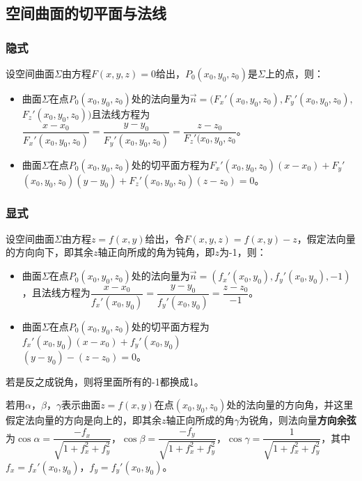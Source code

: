 \documentclass[UTF8, 12pt]{ctexart}
\begin{document}
\subsection{空间曲面的切平面与法线}

\subsubsection{隐式}

设空间曲面$\varSigma$由方程$F(x,y,z)=0$给出，$P_0(x_0,y_0,z_0)$是$\varSigma$上的点，则：

\begin{itemize}
    \item 曲面$\varSigma$在点$P_0(x_0,y_0,z_0)$处的法向量为$\vec{n}=(F_x'(x_0,y_0,z_0),F_y'(x_0,y_0,z_0),$\\$F_z'(x_0,y_0,z_0))$且法线方程为$\dfrac{x-x_0}{F_x'(x_0,y_0,z_0)}=\dfrac{y-y_0}{F_y'(x_0,y_0,z_0)}=\dfrac{z-z_0}{F_z'(x_0,y_0,z_0}$。
    \item 曲面$\varSigma$在点$P_0(x_0,y_0,z_0)$处的切平面方程为$F_x'(x_0,y_0,z_0)(x-x_0)+F_y'$\\$(x_0,y_0,z_0)(y-y_0)+F_z'(x_0,y_0,z_0)(z-z_0)=0$。
\end{itemize}

\subsubsection{显式}

设空间曲面$\varSigma$由方程$z=f(x,y)$给出，令$F(x,y,z)=f(x,y)-z$，假定法向量的方向向下，即其余$z$轴正向所成的角为钝角，即$z$为-1，则：

\begin{itemize}
    \item 曲面$\varSigma$在点$P_0(x_0,y_0,z_0)$处的法向量为$\vec{n}=(f_x'(x_0,y_0),f_y'(x_0,y_0),-1)$，且法线方程为$\dfrac{x-x_0}{f_x'(x_0,y_0)}=\dfrac{y-y_0}{f_y'(x_0,y_0)}=\dfrac{z-z_0}{-1}$。
    \item 曲面$\varSigma$在点$P_0(x_0,y_0,z_0)$处的切平面方程为$f_x'(x_0,y_0)(x-x_0)+f_y'(x_0,y_0)$\\$(y-y_0)-(z-z_0)=0$。
\end{itemize}

若是反之成锐角，则将里面所有的-1都换成1。

若用$\alpha$，$\beta$，$\gamma$表示曲面$z=f(x,y)$在点$(x_0,y_0,z_0)$处的法向量的方向角，并这里假定法向量的方向是向上的，即其余$z$轴正向所成的角$\gamma$为锐角，则法向量\textbf{方向余弦}为$\cos\alpha=\dfrac{-f_x}{\sqrt{1+f_x^2+f_y^2}}$，$\cos\beta=\dfrac{-f_y}{\sqrt{1+f_x^2+f_y^2}}$，$\cos\gamma=\dfrac{1}{\sqrt{1+f_x^2+f_y^2}}$，其中$f_x=f_x'(x_0,y_0)$，$f_y=f_y'(x_0,y_0)$。
\end{document}
